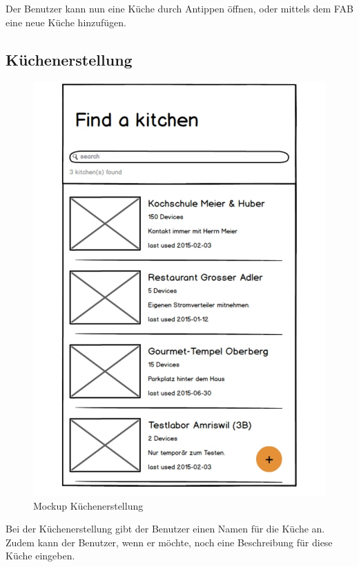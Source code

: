 Der Benutzer kann nun eine Küche durch Antippen öffnen, oder mittels dem \ac{FAB} eine neue Küche hinzufügen.

\vspace{3cm}

\subsection{Küchenerstellung}
\label{subsec:Küchenerstellung}

\begin{figure}
	\includegraphics[page=2,trim=0 0 0 0,clip,scale=0.21]{uiux/res/mockups}
	\caption{Mockup Küchenerstellung}
    \label{abb:mockCreateKitchen}
\end{figure}

Bei der Küchenerstellung gibt der Benutzer einen Namen für die Küche an. Zudem kann der Benutzer, wenn er möchte, noch eine Beschreibung für diese Küche eingeben.

